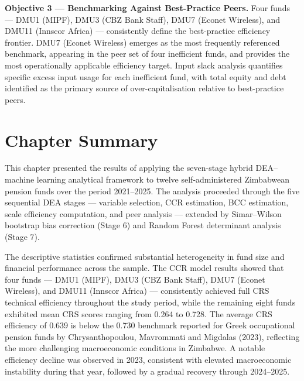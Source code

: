 \documentclass[12pt,a4paper]{article}
\begin{document}
\textbf{Objective 3 --- Benchmarking Against Best-Practice Peers.} Four funds --- DMU1 (MIPF), DMU3 (CBZ Bank Staff), DMU7 (Econet Wireless), and DMU11 (Innscor Africa) --- consistently define the best-practice efficiency frontier. DMU7 (Econet Wireless) emerges as the most frequently referenced benchmark, appearing in the peer set of four inefficient funds, and provides the most operationally applicable efficiency target. Input slack analysis quantifies specific excess input usage for each inefficient fund, with total equity and debt identified as the primary source of over-capitalisation relative to best-practice peers.

\section{Chapter Summary}

This chapter presented the results of applying the seven-stage hybrid DEA--machine learning analytical framework to twelve self-administered Zimbabwean pension funds over the period 2021--2025. The analysis proceeded through the five sequential DEA stages --- variable selection, CCR estimation, BCC estimation, scale efficiency computation, and peer analysis --- extended by Simar--Wilson bootstrap bias correction (Stage 6) and Random Forest determinant analysis (Stage 7).

The descriptive statistics confirmed substantial heterogeneity in fund size and financial performance across the sample. The CCR model results showed that four funds --- DMU1 (MIPF), DMU3 (CBZ Bank Staff), DMU7 (Econet Wireless), and DMU11 (Innscor Africa) --- consistently achieved full CRS technical efficiency throughout the study period, while the remaining eight funds exhibited mean CRS scores ranging from 0.264 to 0.728. The average CRS efficiency of 0.639 is below the 0.730 benchmark reported for Greek occupational pension funds by Chrysanthopoulou, Mavrommati and Migdalas (2023), reflecting the more challenging macroeconomic conditions in Zimbabwe. A notable efficiency decline was observed in 2023, consistent with elevated macroeconomic instability during that year, followed by a gradual recovery through 2024--2025.
\end{document}
